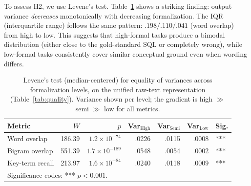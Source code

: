 \documentclass[runningheads]{llncs}
\begin{document}

To assess H2, we use 
Levene's test. Table~\ref{tab:levene} shows a striking finding: output variance \emph{decreases} monotonically with decreasing formalization.
The IQR (interquartile range) follows the same pattern: $.198/.110/.041$ (word overlap) from high to low. This suggests that high-formal tasks produce a bimodal distribution (either close to the gold-standard SQL or completely wrong), while low-formal tasks consistently cover similar conceptual ground even when wording differs.

\begin{table}[ht]
\centering
\caption{Levene's test (median-centered) for equality of variances across formalization levels, on the unified raw-text representation (Table~\ref{tab:quality}). Variance shown per level; the gradient is high $\gg$ semi $\gg$ low for all metrics.}
\label{tab:levene}
\setlength{\tabcolsep}{6pt}
\begin{tabular}{lrrrrrl}
\toprule
Metric & $W$ & $p$ & Var$_{\text{High}}$ & Var$_{\text{Semi}}$ & Var$_{\text{Low}}$ & Sig. \\
\midrule
Word overlap    & 186.39 & $1.2 \times 10^{-74}$  & .0226 & .0115 & .0008 & *** \\
Bigram overlap  & 551.39 & $1.7 \times 10^{-189}$ & .0548 & .0054 & .0002 & *** \\
Key-term recall & 213.97 & $1.6 \times 10^{-84}$  & .0240 & .0118 & .0009 & *** \\
\bottomrule
\multicolumn{4}{l}{\scriptsize Significance codes: *** $p < 0.001$.}
\end{tabular}
\end{table}
\end{document}
